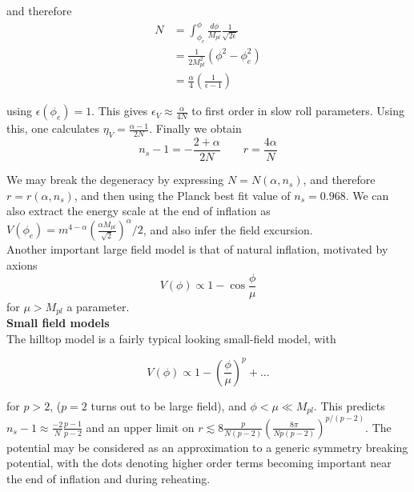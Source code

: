 \documentclass[a4paper,10pt]{article}
\newcommand{\Mp}{M_{pl}}
\begin{document}
and therefore
\begin{equation}
\begin{split}
N &= \int_{\phi_e}^\phi \frac{d\phi}{\Mp}\frac{1}{\sqrt{2\epsilon}} \\
&= \frac{1}{2\Mp^2}(\phi^2-\phi^2_e)\\
&= \frac{\alpha}{4}\left(\frac{1}{\epsilon-1}\right)
\end{split}
\end{equation}

using $\epsilon(\phi_e)=1$. This gives $\epsilon_V \approx \frac{\alpha}{4N}$ to first order in slow roll parameters. Using this, one calculates $\eta_V=\frac{\alpha-1}{2N}$. Finally we obtain
\begin{equation}
n_s-1 = -\frac{2+\alpha}{2N} \qquad r=\frac{4\alpha}{N}
\end{equation}

We may break the degeneracy by expressing  $N=N(\alpha, n_s)$, and therefore $r=r(\alpha, n_s)$, and then using the Planck best fit value of $n_s=0.968$. We can also extract the energy scale at the end of inflation as  $V(\phi_e)=m^{4-\alpha}(\frac{\alpha\Mp}{\sqrt{2}})^\alpha/2$, and also infer the field excursion.\\

Another important large field model is that of natural inflation, motivated by axions
\begin{equation}
V(\phi) \propto 1-\cos\frac{\phi}{\mu}
\end{equation}
for $\mu>\Mp$ a parameter.\\

\textbf{Small field models} \\

The hilltop model is a fairly typical looking small-field model, with

\begin{equation}
V(\phi) \propto 1-\left(\frac{\phi}{\mu}\right)^p + ... 
\end{equation}

for $p>2$, ($p=2$ turns out to be large field), and $\phi<\mu \ll \Mp$. This predicts $n_s-1 \approx \frac{-2}{N}\frac{p-1}{p-2}$ and an upper limit on $r\lesssim 8\frac{p}{N(p-2)}(\frac{8\pi}{Np(p-2)})^{p/(p-2)}$. The potential may be considered as an approximation to a generic symmetry breaking potential, with the dots denoting higher order terms becoming important near the end of inflation and during reheating. \\
\end{document}
